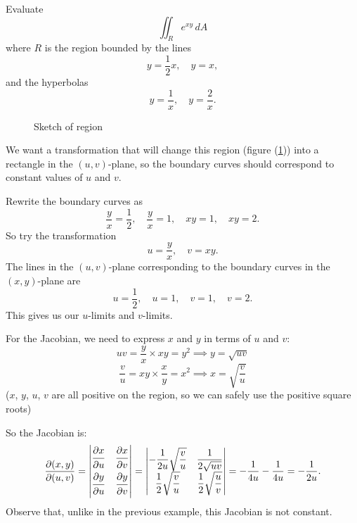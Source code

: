   \begin{example}
    Evaluate
      \[
        \iint_R e^{xy} \, dA
      \]
    where $R$ is the region bounded by the lines
      \[
        y = \frac{1}{2}x, \quad y = x,
      \]
    and the hyperbolas
      \[
        y = \frac{1}{x}, \quad y = \frac{2}{x}.
      \]
 
  \begin{figure}[H]
    \centering
    \def\svgwidth{0.6\columnwidth}
    
    \caption{Sketch of region}    
    \label{JacobianHyperbolae}
  \end{figure}

    We want a transformation that will change this region (figure (\ref{JacobianHyperbolae})) into a rectangle in the $(u, v)$-plane, so the boundary curves should correspond to constant values of $u$ and $v$.

    Rewrite the boundary curves as
      \[
        \frac{y}{x} = \frac{1}{2}, \quad \frac{y}{x} = 1, \quad xy = 1, \quad xy = 2.
      \]
    So try the transformation
      \[
        u = \frac{y}{x}, \quad v = xy.
      \]
    The lines in the $(u, v)$-plane corresponding to the boundary curves in the $(x, y)$-plane are
      \[
        u = \frac{1}{2}, \quad u = 1, \quad v = 1, \quad v = 2.
      \]
    This gives us our $u$-limits and $v$-limits.

    For the Jacobian, we need to express $x$ and $y$ in terms of $u$ and $v$:
      \[
        uv = \frac{y}{x} \times xy = y^2 \implies y = \sqrt{uv}
      \]
      \[
        \frac{v}{u} = xy \times \frac{x}{y} = x^2 \implies x = \sqrt{\frac{v}{u}}
      \]
    ($x$, $y$, $u$, $v$ are all positive on the region, so we can safely use the positive square roots)

    So the Jacobian is:
    \[
      \frac{\partial(x, y)}{\partial(u, v)} = \left|
      \begin{matrix}
        \dfrac{\strut\partial x}{\strut\partial u} & \dfrac{\strut\partial x}{\strut\partial v}  \\
        \dfrac{\strut\partial y}{\strut\partial u} & \dfrac{\strut\partial y}{\strut\partial v}
      \end{matrix}
      \right| =
      \left|
      \begin{matrix}
        - \dfrac{1}{2u}\sqrt{\dfrac{v}{u}} & \dfrac{1}{2\sqrt{uv}}  \\
        \dfrac{1}{2}\sqrt{\dfrac{v}{u}} & \dfrac{1}{2}\sqrt{\dfrac{u}{v}}
      \end{matrix}
      \right| = - \frac{1}{4u} - \frac{1}{4u} = - \frac{1}{2u}.
    \]
    Observe that, unlike in the previous example, this Jacobian is not constant.


\end{example}
